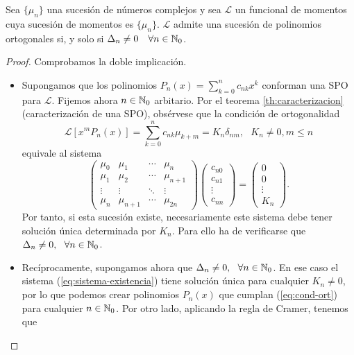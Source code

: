 \begin{teorema}
    Sea $\{\mu_n\}$ una sucesión de números complejos y sea $\mathcal{L}$ un funcional de momentos cuya sucesión de momentos es $\{\mu_n\}$. $\mathcal L$ admite una sucesión de polinomios ortogonales si, y solo si $\Delta_n\neq 0\ \ \ \forall n\in\mathbb{N}_0$. 
\end{teorema}
\begin{proof} Comprobamos la doble implicación.

    \begin{itemize}
        \item[\fbox{$\Rightarrow$}] Supongamos que los polinomios $P_n(x) = \sum_{k=0}^n c_{nk}x^k$ conforman una SPO para $\mathcal L$. Fijemos ahora $n\in\mathbb{N}_0$ arbitario. Por el teorema \ref{th:caracterizacion} (caracterización de una SPO), obsérvese que la condición de ortogonalidad 
        \begin{equation}
            \label{eq:cond-ort}
            \mathcal{L}[x^m P_n(x)]= \sum_{k=0}^n c_{nk} \mu_{k+m} = K_n\delta_{nm}, \ \ \ K_n\neq 0, m\leq n
        \end{equation}
        equivale al sistema
        \begin{equation}
            \label{eq:sistema-existencia}
            \begin{pmatrix}
                \mu_0 & \mu_1 & \cdots & \mu_n \\
                \mu_1 & \mu_2 & \cdots & \mu_{n+1} \\
                \vdots & \vdots & \ddots & \vdots \\
                \mu_n & \mu_{n+1} & \cdots & \mu_{2n}
            \end{pmatrix} \begin{pmatrix}
                c_{n0} \\ c_{n1} \\ \vdots \\ c_{nn}
            \end{pmatrix} = \begin{pmatrix}
                0 \\ 0 \\ \vdots \\ K_n
            \end{pmatrix}.
        \end{equation}
        Por tanto, si esta sucesión existe, necesariamente este sistema debe tener solución única determinada por $K_n$. Para ello ha de verificarse que $\Delta_n\neq 0, \ \ \forall n\in\mathbb{N}_0$.
        \item[\fbox{$\Leftarrow$}] Recíprocamente, supongamos ahora que $\Delta_n\neq 0, \ \ \forall n\in\mathbb{N}_0$. En ese caso el sistema (\ref{eq:sistema-existencia}) tiene solución única para cualquier $K_n\neq 0$, por lo que podemos crear polinomios $P_n(x)$ que cumplan (\ref{eq:cond-ort}) para cualquier $n\in\mathbb{N}_0$. Por otro lado, aplicando la regla de Cramer, tenemos que

\end{itemize}
\end{proof}
